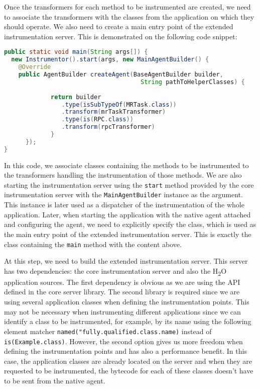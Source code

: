 Once the transformers for each method to be instrumented are created, we need to associate the transformers with the classes from the application on which they should operate. We also need to create a main entry point of the extended instrumentation server. This is demonstrated on the following code snippet:

\begin{lstlisting}[language=Java]
public static void main(String args[]) {
  new Instrumentor().start(args, new MainAgentBuilder() {
    @Override
    public AgentBuilder createAgent(BaseAgentBuilder builder, 
                                      String pathToHelperClasses) {
	 		 
	 		 return builder
		 		.type(isSubTypeOf(MRTask.class))
				.transform(mrTaskTransformer)
				.type(is(RPC.class))
				.transform(rpcTransformer)
	         }
	  });
}			 
\end{lstlisting}
In this code, we associate classes containing the methods to be instrumented to the transformers handling the instrumentation of those methods. We are also starting the instrumentation server using the \texttt{start} method provided by the core instrumentation server with the \texttt{MainAgentBuilder} instance as the argument. This instance is later used as a dispatcher of the instrumentation of the whole application. Later, when starting the application with the native agent attached and configuring the agent, we need to explicitly specify the class, which is used as the main entry point of the extended instrumentation server. This is exactly the class containing the \texttt{main} method with the content above.

At this step, we need to build the extended instrumentation server. This server has two dependencies: the core instrumentation server and also the H\textsubscript{2}O application sources. The first dependency is obvious as we are using the API defined in the core server library. The second library is required since we are using several application classes when defining the instrumentation points. This may not be necessary when instrumenting different applications since we can identify a class to be instrumented, for example, by its name using the following element matcher \texttt{named("fully.qualified.class.name)} instead of \texttt{is(Example.class)}. However, the second option gives us more freedom when defining the instrumentation points and has also a performance benefit. In this case, the application classes are already located on the server and when they are requested to be instrumented, the  bytecode for each of these classes doesn't have to be sent from the native agent. 

